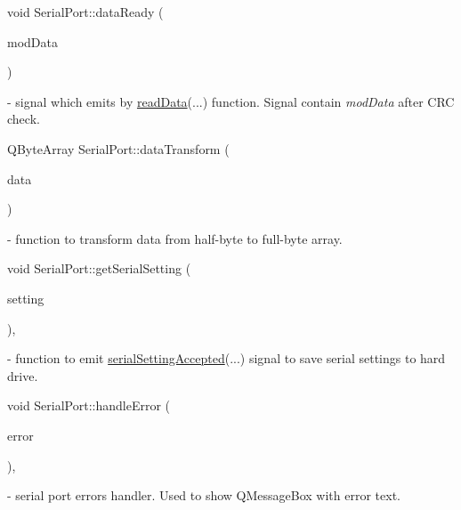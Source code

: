 \mbox{\label{classSerialPort_aa958ae188335f80fd08ebad93e977134}} 
{\footnotesize\ttfamily void Serial\+Port\+::\texorpdfstring{data\+Ready}{dataReady}{\footnotesize\ttfamily [2/2]} (\begin{DoxyParamCaption}\item[{\mbox{\hyperlink{serialport_8h_a2331c0232719069f0bce03c249d2eec6}{Mod\+Data}}}]{mod\+Data }\end{DoxyParamCaption})\hspace{0.3cm}{\ttfamily [signal]}} - signal which emits by \hyperlink{classSerialPort_a0b8fe1371e829199856e8cae942de94e}{read\+Data}(...) function. Signal contain \textit{mod\+Data} after C\+R\+C check.

\mbox{\label{classSerialPort_a8be1b40710483fea19e272b04568f14e}} 
{\footnotesize\ttfamily Q\+Byte\+Array Serial\+Port\+::\texorpdfstring{data\+Transform}{dataTransform} (\begin{DoxyParamCaption}\item[{Q\+Byte\+Array}]{data }\end{DoxyParamCaption})\hspace{0.3cm}{\ttfamily [private]}} - function to transform data from half-byte to full-byte array.

\mbox{\label{classSerialPort_a39602f4cf8fe4570fa3b69d633534be5}} 
{\footnotesize\ttfamily void Serial\+Port\+::\texorpdfstring{get\+Serial\+Setting}{getSerialSetting} (\begin{DoxyParamCaption}\item[{\mbox{\hyperlink{structComSettings}{Com\+Settings}}}]{setting }\end{DoxyParamCaption})\hspace{0.3cm}{\ttfamily [private]}, {\ttfamily [slot]}} - function to emit \hyperlink{classSerialPort_a30f185f507d89b40a0204b6472da3217}{serial\+Setting\+Accepted}(...) signal to save serial settings to hard drive. 

\mbox{\label{classSerialPort_a307128aa2e5ad6b89e47898bff7a48e0}} 
{\footnotesize\ttfamily void Serial\+Port\+::\texorpdfstring{handle\+Error}{handleError} (\begin{DoxyParamCaption}\item[{Q\+Serial\+Port\+::\+Serial\+Port\+Error}]{error }\end{DoxyParamCaption})\hspace{0.3cm}{\ttfamily [private]}, {\ttfamily [slot]}} - serial port errors handler. Used to show Q\+Message\+Box with error text.

